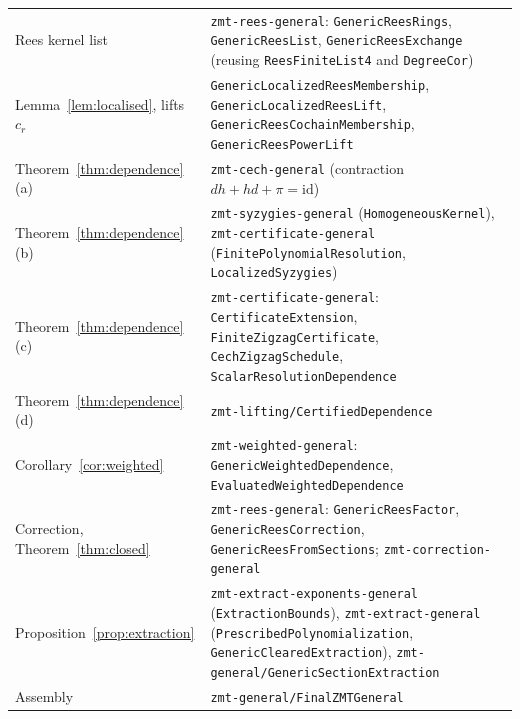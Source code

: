 \documentclass[11pt]{amsart}
\numberwithin{equation}{section}
\theoremstyle{definition}
\theoremstyle{remark}
\newcommand{\code}[1]{\texttt{#1}}
\begin{document}
{\begin{longtable}{>{\raggedright\arraybackslash}p{}>{\raggedright\arraybackslash}p{}}
Rees kernel list & \code{zmt-rees-general}: \code{GenericReesRings},
 \code{GenericReesList}, \code{GenericReesExchange}
 (reusing \code{ReesFiniteList4} and \code{DegreeCor})\\
Lemma~\ref{lem:localised}, lifts $c_r$ & \code{GenericLocalizedReesMembership},
 \code{GenericLocalizedReesLift}, \code{GenericReesCochainMembership},
 \code{GenericReesPowerLift}\\
Theorem~\ref{thm:dependence}(a) & \code{zmt-cech-general} (contraction
 $dh+hd+\pi=\mathrm{id}$)\\
Theorem~\ref{thm:dependence}(b) & \code{zmt-syzygies-general}
 (\code{HomogeneousKernel}), \code{zmt-certificate-general}
 (\code{FinitePolynomialResolution}, \code{LocalizedSyzygies})\\
Theorem~\ref{thm:dependence}(c) & \code{zmt-certificate-general}:
 \code{CertificateExtension}, \code{FiniteZigzagCertificate},
 \code{CechZigzagSchedule}, \code{ScalarResolutionDependence}\\
Theorem~\ref{thm:dependence}(d) & \code{zmt-lifting/CertifiedDependence}\\
Corollary~\ref{cor:weighted} & \code{zmt-weighted-general}:
 \code{GenericWeightedDependence}, \code{EvaluatedWeightedDependence}\\
Correction, Theorem~\ref{thm:closed} & \code{zmt-rees-general}:
 \code{GenericReesFactor}, \code{GenericReesCorrection},
 \code{GenericReesFromSections}; \code{zmt-correction-general}\\
Proposition~\ref{prop:extraction} & \code{zmt-extract-exponents-general}
 (\code{ExtractionBounds}), \code{zmt-extract-general}
 (\code{PrescribedPolynomialization}, \code{GenericClearedExtraction}),
 \code{zmt-general/GenericSectionExtraction}\\
Assembly & \code{zmt-general/FinalZMTGeneral}\\
\bottomrule
\end{longtable}}
\end{document}
